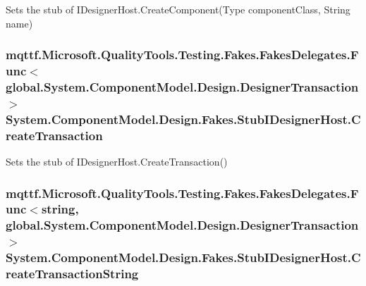 Sets the stub of I\-Designer\-Host.\-Create\-Component(\-Type component\-Class, String name)

\hypertarget{class_system_1_1_component_model_1_1_design_1_1_fakes_1_1_stub_i_designer_host_ad3afbc50496e7d4ac8973925a6741ea1}{
\subsubsection[{Create\-Transaction}]{\setlength{\rightskip}{0pt plus 5cm}mqttf.\-Microsoft.\-Quality\-Tools.\-Testing.\-Fakes.\-Fakes\-Delegates.\-Func$<$global.\-System.\-Component\-Model.\-Design.\-Designer\-Transaction$>$ System.\-Component\-Model.\-Design.\-Fakes.\-Stub\-I\-Designer\-Host.\-Create\-Transaction}}\label{class_system_1_1_component_model_1_1_design_1_1_fakes_1_1_stub_i_designer_host_ad3afbc50496e7d4ac8973925a6741ea1}


Sets the stub of I\-Designer\-Host.\-Create\-Transaction()

\hypertarget{class_system_1_1_component_model_1_1_design_1_1_fakes_1_1_stub_i_designer_host_a1093c8e5dc6e9aa3957066263de2d7bd}{
\subsubsection[{Create\-Transaction\-String}]{\setlength{\rightskip}{0pt plus 5cm}mqttf.\-Microsoft.\-Quality\-Tools.\-Testing.\-Fakes.\-Fakes\-Delegates.\-Func$<$string, global.\-System.\-Component\-Model.\-Design.\-Designer\-Transaction$>$ System.\-Component\-Model.\-Design.\-Fakes.\-Stub\-I\-Designer\-Host.\-Create\-Transaction\-String}}\label{class_system_1_1_component_model_1_1_design_1_1_fakes_1_1_stub_i_designer_host_a1093c8e5dc6e9aa3957066263de2d7bd}


